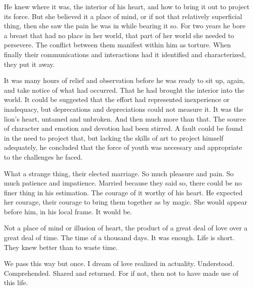 

He knew where it was, the interior of his heart, and how to bring it
out to project its force.  But she believed it a place of mind, or if
not that relatively superficial thing, then she saw the pain he was in
while bearing it so.  For two years he bore a breast that had no place
in her world, that part of her world she needed to persevere.  The
conflict between them manifest within him as torture.  When finally
their communications and interactions had it identified and
characterized, they put it away.

It was many hours of relief and observation before he was ready to sit
up, again, and take notice of what had occurred.  That he had brought
the interior into the world.  It could be suggested that the effort
had represented inexperience or inadequacy, but deprecations and
depreciations could not measure it.  It was the lion's heart, untamed
and unbroken.  And then much more than that.  The source of character
and emotion and devotion had been stirred.  A fault could be found in
the need to project that, but lacking the skills of art to project
himself adequately, he concluded that the force of youth was necessary
and appropriate to the challenges he faced.

What a strange thing, their elected marriage.  So much pleasure and
pain.  So much patience and impatience.  Married because they said so,
there could be no finer thing in his estimation.  The courage of it
worthy of his heart.  He expected her courage, their courage to bring
them together as by magic.  She would appear before him, in his local
frame.  It would be.

Not a place of mind or illusion of heart, the product of a great deal
of love over a great deal of time.  The time of a thousand days.  It
was enough.  Life is short.  They knew better than to waste time.

We pass this way but once.  I dream of love realized in actuality.
Understood.  Comprehended.  Shared and returned.  For if not, then
not to have made use of this life.

\bye
